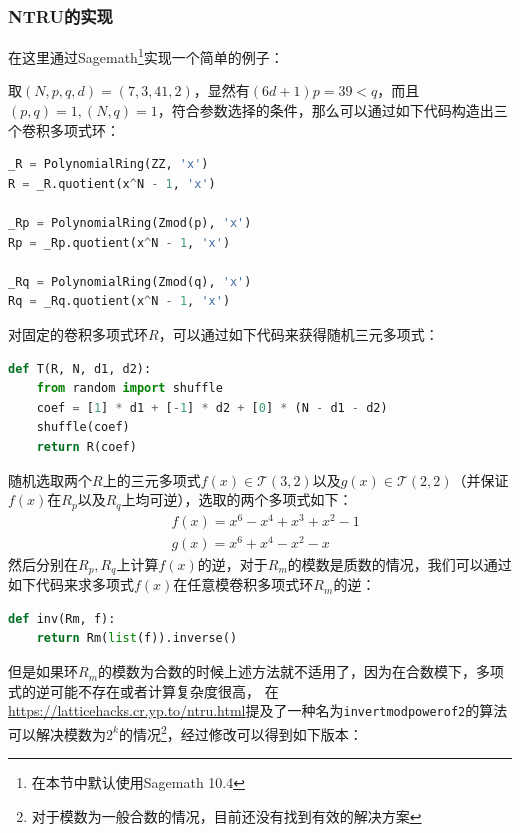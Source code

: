 \documentclass{book}
\numberwithin{equation}{subsubsection}
\begin{document}
\subsubsection{NTRU的实现}
在这里通过Sagemath\footnote{在本节中默认使用Sagemath 10.4}实现一个简单的例子\cite{22}：\par
取$(N, p, q, d) = (7, 3, 41, 2)$，显然有$(6d+1)p=39<q$，而且$(p,q)=1,(N,q)=1$，符合参数选择的条件，那么可以通过如下代码构造出三个卷积多项式环：
\begin{lstlisting}[language=Python,basicstyle=\ttfamily,breaklines=true,keywordstyle=\bfseries\color{blue}]
_R = PolynomialRing(ZZ, 'x')
R = _R.quotient(x^N - 1, 'x')

_Rp = PolynomialRing(Zmod(p), 'x')
Rp = _Rp.quotient(x^N - 1, 'x')

_Rq = PolynomialRing(Zmod(q), 'x')
Rq = _Rq.quotient(x^N - 1, 'x')
\end{lstlisting}
对固定的卷积多项式环$R$，可以通过如下代码来获得随机三元多项式：
\begin{lstlisting}[language=Python,basicstyle=\ttfamily,breaklines=true,keywordstyle=\bfseries\color{blue}]
def T(R, N, d1, d2):
    from random import shuffle
    coef = [1] * d1 + [-1] * d2 + [0] * (N - d1 - d2)
    shuffle(coef)
    return R(coef)
\end{lstlisting}
随机选取两个$R$上的三元多项式$f(x)\in\mathcal{T}(3,2)$以及$g(x)\in\mathcal{T}(2,2)$（并保证$f(x)$在$R_p$以及$R_q$上均可逆），选取的两个多项式如下：
\begin{equation}
    \begin{aligned}
        &f(x)=x^6−x^4+x^3+x^2−1\\
        &g(x)=x^6+x^4−x^2−x
    \end{aligned}
    \nonumber
\end{equation}
然后分别在$R_p,R_q$上计算$f(x)$的逆，对于$R_m$的模数是质数的情况，我们可以通过如下代码来求多项式$f(x)$在任意模卷积多项式环$R_m$的逆：
\begin{lstlisting}[language=Python,basicstyle=\ttfamily,breaklines=true,keywordstyle=\bfseries\color{blue}]
def inv(Rm, f):
    return Rm(list(f)).inverse()
\end{lstlisting}
但是如果环$R_m$的模数为合数的时候上述方法就不适用了，因为在合数模下，多项式的逆可能不存在或者计算复杂度很高，
在\href{https://latticehacks.cr.yp.to/ntru.html}{https://latticehacks.cr.yp.to/ntru.html}提及了一种名为\texttt{invertmodpowerof2}的算法可以解决模数为$2^k$的情况\footnote{对于模数为一般合数的情况，目前还没有找到有效的解决方案}，经过修改可以得到如下版本：
\end{document}
